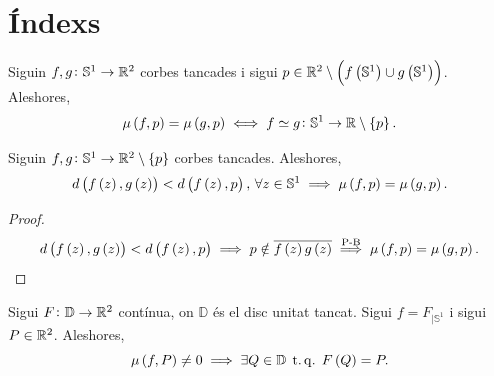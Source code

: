 \section{Índexs}

\begin{teo*}
    Siguin $f, g \colon \mathbb{S}^1 \to \mathbb{R} ^2$ corbes tancades i sigui $p\in \mathbb{R}^2 \setminus \left( f\left( \mathbb{S}^1\right) \cup g\left( \mathbb{S}^1\right)\right)$. Aleshores,
    \[
        \mu \left( f, p\right) = \mu\left( g, p \right) \iff f \simeq g  \colon \mathbb{S}^1 \to \mathbb{R} \setminus \left\{ p \right\}.
    \]
\end{teo*}

\begin{teo*}[Rouché]
    Siguin $f, g \colon \mathbb{S}^1 \to \mathbb{R} ^2 \setminus \left\{ p \right\}$ corbes tancades. Aleshores,
    \[
        d \left( f \left( z \right), g \left( z \right) \right) < d \left( f \left( z \right), p \right), \, \forall z\in \mathbb{S}^1 \implies \mu \left( f, p\right) = \mu\left( g, p \right).
    \]
    
\end{teo*}
\begin{proof}
    \[
        d \left( f \left( z \right), g \left( z \right) \right) < d \left( f \left( z \right), p \right) \implies p \notin \overline{f\left( z \right) g \left( z \right)} \stackrel{\text{P-B}}{\implies} \mu \left( f, p\right) = \mu\left( g, p \right).
    \]
\end{proof}
\begin{teo*}
	Sigui $F\colon \mathbb{D} \to \mathbb{R} ^2$ contínua, on $\mathbb{D}$ és el disc unitat tancat. Sigui $f=F_{|\mathbb{S}^1}$ i sigui $P \in \mathbb{R} ^2$. Aleshores,
	\[
		\mu\left( f, P \right) \neq 0 \implies \exists Q \in \mathbb{D} \operatorname{\;t.q.\;} F\left( Q \right) = P.
	\]
\end{teo*}

